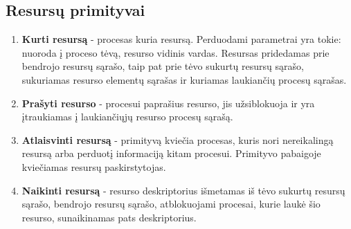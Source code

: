 	\subsection{Resursų primityvai}
		\begin{enumerate}
			\item \textbf{Kurti resursą} - procesas kuria resursą. Perduodami parametrai yra tokie: nuoroda į proceso tėvą, resurso vidinis vardas. Resursas pridedamas prie bendrojo resursų sąrašo, taip pat prie tėvo sukurtų resursų sąrašo, sukuriamas resurso elementų sąrašas ir kuriamas laukiančių procesų sąrašas.
			\item \textbf{Prašyti resurso} - procesui paprašius resurso, jis užsiblokuoja ir yra įtraukiamas į laukiančiųjų resurso procesų sąrašą.
			\item \textbf{Atlaisvinti resursą} - primityvą kviečia procesas, kuris nori nereikalingą resursą arba perduotį informaciją kitam procesui. Primityvo pabaigoje kviečiamas resursų paskirstytojas.
			\item \textbf{Naikinti resursą} - resurso deskriptorius išmetamas iš tėvo sukurtų resursų sąrašo, bendrojo resursų sąrašo, atblokuojami procesai, kurie laukė šio resurso, sunaikinamas pats deskriptorius.
		\end{enumerate}
		